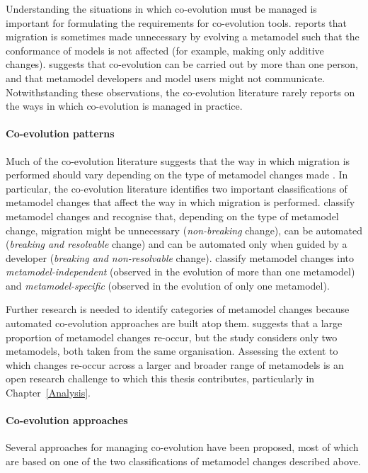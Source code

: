 Understanding the situations in which co-evolution must be managed is important for formulating the requirements for co-evolution tools. \cite{herrmannsdoerfer09cope} reports that migration is sometimes made unnecessary by evolving a metamodel such that the conformance of models is not affected (for example, making only additive changes). \cite{cicchetti08automating} suggests that co-evolution can be carried out by more than one person, and that metamodel developers and model users might not communicate. Notwithstanding these observations, the co-evolution literature rarely reports on the ways in which co-evolution is managed in practice. 

\paragraph{Co-evolution patterns}
Much of the co-evolution literature suggests that the way in which migration is performed should vary depending on the type of metamodel changes made \cite{gruschko07towards,herrmannsdoerfer09cope,cicchetti08automating,garces09managing}. In particular, the co-evolution literature identifies two important classifications of metamodel changes that affect the way in which migration is performed. \cite{gruschko07towards} classify metamodel changes and recognise that, depending on the type of metamodel change, migration might be unnecessary (\emph{non-breaking} change), can be automated (\emph{breaking and resolvable} change) and can be automated only when guided by a developer (\emph{breaking and non-resolvable} change). \cite{herrmannsdoerfer08automatability} classify metamodel changes into \emph{metamodel-independent} (observed in the evolution of more than one metamodel) and \emph{metamodel-specific} (observed in the evolution of only one metamodel).

Further research is needed to identify categories of metamodel changes because automated co-evolution approaches are built atop them. \cite{herrmannsdoerfer08automatability} suggests that a large proportion of metamodel changes re-occur, but the study considers only two metamodels, both taken from the same organisation. Assessing the extent to which changes re-occur across a larger and broader range of metamodels is an open research challenge to which this thesis contributes, particularly in Chapter~\ref{Analysis}.

\paragraph{Co-evolution approaches}
Several approaches for managing co-evolution have been proposed, most of which are based on one of the two classifications of metamodel changes described above.

